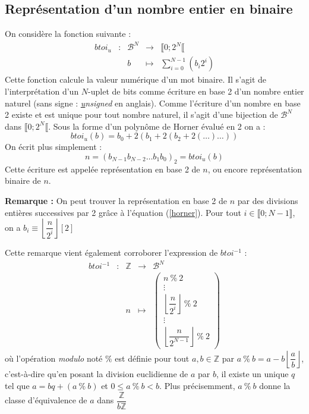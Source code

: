 \documentclass[../../main.tex]{subfiles}
\begin{document}
\subsection{Représentation d'un nombre entier en binaire} \label{sub:repr_sentation_d_un_nombre_entier_en_binaire}
On considère la fonction suivante :
$$
\begin{array}{lclcl}
btoi_{u} & : & \mathcal{B}^{N} & \rightarrow & \llbracket 0; 2^{N}\llbracket \\
     &   & b & \mapsto & \displaystyle\sum_{i = 0}^{N-1}(b_{i}2^{i})
\end{array}
$$
Cette fonction calcule la valeur numérique d'un mot binaire. Il s'agit de l'interprétation d'un $N$-uplet de bits comme écriture en base 2 d'un nombre entier naturel (sans signe : \textit{\underline{u}nsigned} en anglais). Comme l'écriture d'un nombre en base 2 existe et est unique pour tout nombre naturel, il s'agit d'une bijection de $\mathcal{B}^{N}$ dans $\llbracket 0; 2^{N}\llbracket $. \newline
Sous la forme d'un polynôme de Horner évalué en 2 on a :
\begin{equation}\label{horner}
btoi_{u}(b) = b_{0} + 2(b_{1} + 2(b_{2} + 2(\dots)\dots))
\end{equation}
On écrit plus simplement :
$$n = (b_{N-1}b_{N-2}\dots b_{1}b_{0})_{2} = btoi_{u}(b)$$
Cette écriture est appelée représentation en base 2 de $n$, ou encore représentation binaire de $n$.

\textbf{Remarque :} On peut trouver la représentation en base 2 de $n$ par des divisions entières successives par 2 grâce à l'équation (\ref{horner}). Pour tout $i\in{\llbracket{0; N-1}\rrbracket}$, on a $b_{i} \equiv{\left\lfloor{\dfrac{n}{2^{i}}}\right\rfloor{[2]}}$ 

Cette remarque vient également corroborer l'expression de $btoi^{-1}$ :
$$
\begin{array}{lclcl}
btoi^{-1} & : & \mathbb{Z} & \rightarrow & \mathcal{B}^{N} \\
     &   & n & \mapsto & \begin{pmatrix}
n\ \%\ 2 \\
\vdots \\
\left\lfloor\dfrac{n}{2^{i}}\right\rfloor\ \%\ 2 \\
\vdots \\
\left\lfloor\dfrac{n}{2^{N-1}}\right\rfloor\ \%\ 2
\end{pmatrix}
\end{array}
$$
où l'opération \textit{modulo} noté $\%$ est définie pour tout $a, b\in{\mathbb{Z}}$ par $a\ \%\ b = a - b\left\lfloor\dfrac{a}{b}\right\rfloor$, c'est-à-dire qu'en posant la division euclidienne de $a$ par $b$, il existe un unique $q$ tel que $a = bq + (a\ \%\ b)$ et $0 \leq a\ \%\ b < b$.\newline
Plus précisemment, $a\ \%\ b$ donne la classe d'équivalence de $a$ dans $\dfrac{\mathbb{Z}}{b\mathbb{Z}}$
\end{document}
